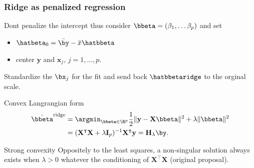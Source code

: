 \documentclass{beamer}\usepackage[]{graphicx}\usepackage[]{color}
\begin{document}
\begin{frame}
  \frametitle{Ridge as penalized regression}

  \alert{Dont  penalize   the  intercept}  thus  consider   $\bbeta  =
  (\beta_1,\dots\beta_p)$ and set
  \begin{itemize}
  \item $\hatbeta_0 = \bar{\by} - \bar{x}\hatbbeta$
  \item center $\mathbf{y}$ and $\mathbf{x}_j$, $j=1,\dots,p$.
  \end{itemize}
  \alert{Standardize the $\bx_j$} for the fit and send back
  $\hatbbetaridge$ to the \alert{orginal scale}.

  \vfill

  \begin{block}{Convex Langrangian form}
    \vspace{-.5cm}
    \begin{align*}
      \hat{\bbeta}^{\text{ridge}} &  =   \argmin_{\bbeta\in\R^p}  \frac{1}{2}
      \|\mathbf{y} - \mathbf{X} \bbeta\|^2 + \lambda \|\bbeta\|^2\\
      & = (\mathbf{X}^\intercal \mathbf{X} +
      \lambda \mathbf{I}_p)^{-1} \mathbf{X}^\intercal \mathbf{y} = \mathbf{H}_\lambda \by.
    \end{align*}
  \end{block}

  \vfill

  \begin{block}{Strong convexity}
    Oppositely to  the least squares, a  non-singular solution always
    exists   when    $\lambda>0$   whatever   the    conditioning   of
    $\mathbf{X}^\intercal \mathbf{X}$ (original proposal).
  \end{block}

\end{frame}



\end{document}
